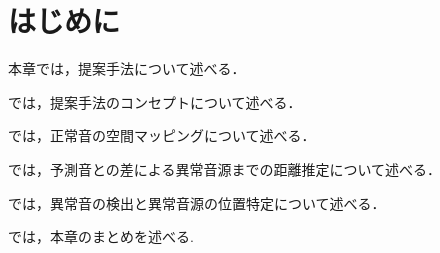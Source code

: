 \documentclass[../main]{subfiles}
\begin{document}
\section{はじめに}
\label{sec:pmethod_introduction}

本章では，提案手法について述べる．

では，提案手法のコンセプトについて述べる．

では，正常音の空間マッピングについて述べる．

では，予測音との差による異常音源までの距離推定について述べる．

では，異常音の検出と異常音源の位置特定について述べる．

では，本章のまとめを述べる.
\end{document}
